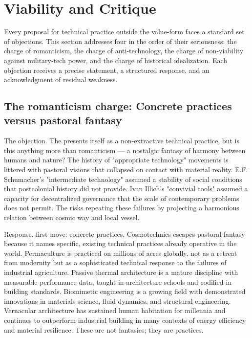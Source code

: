 \section{Viability and Critique}

Every proposal for technical practice outside the value-form faces a standard set of objections. This section addresses four in the order of their seriousness: the charge of romanticism, the charge of anti-technology, the charge of non-viability against military-tech power, and the charge of historical idealization. Each objection receives a precise statement, a structured response, and an acknowledgment of residual weakness.

\subsection{The romanticism charge: Concrete practices versus pastoral fantasy}

The objection. The   presents itself as a non-extractive technical practice, but is this anything more than romanticism — a nostalgic fantasy of harmony between humans and nature? The history of "appropriate technology" movements is littered with pastoral visions that collapsed on contact with material reality. E.F. Schumacher's "intermediate technology" assumed a stability of social conditions that postcolonial history did not provide. Ivan Illich's "convivial tools" assumed a capacity for decentralized governance that the scale of contemporary problems does not permit. The   risks repeating these failures by projecting a harmonious relation between cosmic way and local vessel.

Response, first move: concrete practices. Cosmotechnics escapes pastoral fantasy because it names specific, existing technical practices already operative in the world. Permaculture is practiced on millions of acres globally, not as a retreat from modernity but as a sophisticated technical response to the failures of industrial agriculture. Passive thermal architecture is a mature discipline with measurable performance data, taught in architecture schools and codified in building standards. Biomimetic engineering is a growing field with demonstrated innovations in materials science, fluid dynamics, and structural engineering. Vernacular architecture has sustained human habitation for millennia and continues to outperform industrial building in many contexts of energy efficiency and material resilience. These are not fantasies; they are practices.

